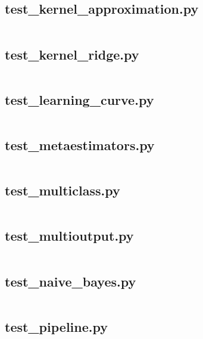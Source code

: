 \documentclass{article}
\begin{document}
\subsection{test\_kernel\_approximation.py}
\inputminted{python}{/home/dufferzafar/dev/@clones/scikit-learn/sklearn/tests/test_kernel_approximation.py}
\newpage

\subsection{test\_kernel\_ridge.py}
\inputminted{python}{/home/dufferzafar/dev/@clones/scikit-learn/sklearn/tests/test_kernel_ridge.py}
\newpage

\subsection{test\_learning\_curve.py}
\inputminted{python}{/home/dufferzafar/dev/@clones/scikit-learn/sklearn/tests/test_learning_curve.py}
\newpage

\subsection{test\_metaestimators.py}
\inputminted{python}{/home/dufferzafar/dev/@clones/scikit-learn/sklearn/tests/test_metaestimators.py}
\newpage

\subsection{test\_multiclass.py}
\inputminted{python}{/home/dufferzafar/dev/@clones/scikit-learn/sklearn/tests/test_multiclass.py}
\newpage

\subsection{test\_multioutput.py}
\inputminted{python}{/home/dufferzafar/dev/@clones/scikit-learn/sklearn/tests/test_multioutput.py}
\newpage

\subsection{test\_naive\_bayes.py}
\inputminted{python}{/home/dufferzafar/dev/@clones/scikit-learn/sklearn/tests/test_naive_bayes.py}
\newpage

\subsection{test\_pipeline.py}
\inputminted{python}{/home/dufferzafar/dev/@clones/scikit-learn/sklearn/tests/test_pipeline.py}
\newpage
\end{document}
